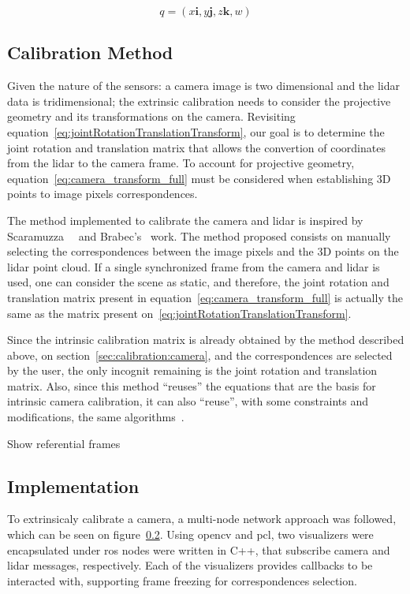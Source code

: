 \begin{equation}
	\label{eq:quaternion-notation}
	q = (x\mathbf{i}, y\mathbf{j}, z\mathbf{k}, w)
\end{equation}

\subsection{Calibration Method}
Given the nature of the sensors: a camera image is two dimensional and the \ac{lidar} data is tridimensional; the extrinsic calibration needs to consider the projective geometry and its transformations on the camera. Revisiting equation~\ref{eq:jointRotationTranslationTransform}, our goal is to determine the joint rotation and translation matrix that allows the convertion of coordinates from the \ac{lidar} to the camera frame. To account for projective geometry, equation~\ref{eq:camera_transform_full} must be considered when establishing 3D points to image pixels correspondences.

The method implemented to calibrate the camera and \ac{lidar} is inspired by Scaramuzza~\etal~\cite{Scaramuzza} and Brabec's~\cite{brabec2014} work. The method proposed consists on manually selecting the correspondences between the image pixels and the 3D points on the \ac{lidar} point cloud. If a single synchronized frame from the camera and \ac{lidar} is used, one can consider the scene as static, and therefore, the joint rotation and translation matrix present in equation~\ref{eq:camera_transform_full} is actually the same as the matrix present on~\ref{eq:jointRotationTranslationTransform}. 

Since the intrinsic calibration matrix is already obtained by the method described above, on section~\ref{sec:calibration:camera}, and the correspondences are selected by the user, the only incognit remaining is the joint rotation and translation matrix. Also, since this method ``reuses'' the equations that are the basis for intrinsic camera calibration, it can also ``reuse'', with some constraints and modifications, the same algorithms~\cite{opencv_doc}.



Show referential frames\todo

\subsection{Implementation}
To extrinsicaly calibrate a camera, a multi-node network approach was followed, which can be seen on figure~\ref{}. Using \ac{opencv} and \ac{pcl}, two visualizers were encapsulated under \ac{ros} nodes were written in C++, that subscribe camera and \ac{lidar} messages, respectively. Each of the visualizers provides callbacks to be interacted with, supporting frame freezing for correspondences selection.

